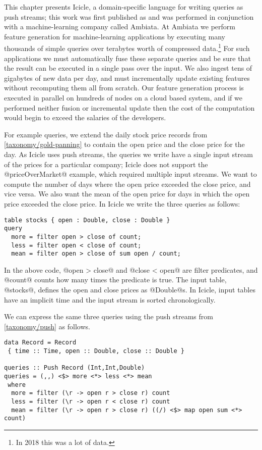 \label{icicle:s:Introduction}

This chapter presents Icicle, a domain-specific language for writing queries as push streams; this work was first published as \citep{robinson2016icicle} and was performed in conjunction with a machine-learning company called Ambiata.
At Ambiata we perform feature generation for machine-learning applications by executing many thousands of simple queries over terabytes worth of compressed data.\footnote{In 2018 this was a lot of data.}
For such applications we must automatically fuse these separate queries and be sure that the result can be executed in a single pass over the input.
We also ingest tens of gigabytes of new data per day, and must incrementally update existing features without recomputing them all from scratch.
Our feature generation process is executed in parallel on hundreds of nodes on a cloud based system, and if we performed neither fusion or incremental update then the cost of the computation would begin to exceed the salaries of the developers.

For example queries, we extend the daily stock price records from \autoref{taxonomy/gold-panning} to contain the open price and the close price for the day.
As Icicle uses push streams, the queries we write have a single input stream of the prices for a particular company; Icicle does not support the @priceOverMarket@ example, which required multiple input streams.
We want to compute the number of days where the open price exceeded the close price, and vice versa.
We also want the mean of the open price for days in which the open price exceeded the close price.
In Icicle we write the three queries as follows:

\begin{lstlisting}
table stocks { open : Double, close : Double }
query 
  more = filter open > close of count;
  less = filter open < close of count;
  mean = filter open > close of sum open / count;
\end{lstlisting}


In the above code, @open > close@ and @close < open@ are filter predicates, and @count@ counts how many times the predicate is true.
The input table, @stocks@, defines the open and close prices as @Double@s.
In Icicle, input tables have an implicit time and the input stream is sorted chronologically.

We can express the same three queries using the push streams from \autoref{taxonomy/push} as follows.

\begin{lstlisting}
data Record = Record
 { time :: Time, open :: Double, close :: Double }

queries :: Push Record (Int,Int,Double)
queries = (,,) <$> more <*> less <*> mean
 where
  more = filter (\r -> open r > close r) count
  less = filter (\r -> open r < close r) count
  mean = filter (\r -> open r > close r) ((/) <$> map open sum <*> count)
\end{lstlisting}

